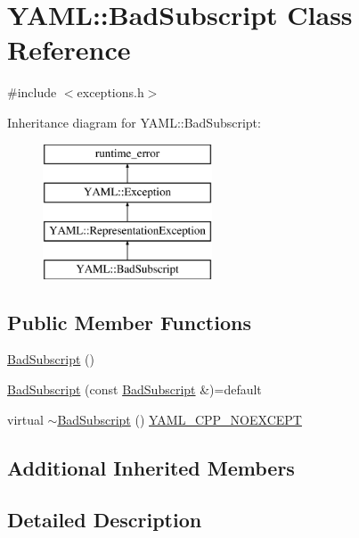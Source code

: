 \hypertarget{class_y_a_m_l_1_1_bad_subscript}{}\section{Y\+A\+ML\+::Bad\+Subscript Class Reference}
\label{class_y_a_m_l_1_1_bad_subscript}


{\ttfamily \#include $<$exceptions.\+h$>$}

Inheritance diagram for Y\+A\+ML\+::Bad\+Subscript\+:\begin{figure}[H]
\begin{center}
\leavevmode
\includegraphics[height=4.000000cm]{class_y_a_m_l_1_1_bad_subscript}
\end{center}
\end{figure}
\subsection*{Public Member Functions}
\begin{DoxyCompactItemize}
\item 
\mbox{\hyperlink{class_y_a_m_l_1_1_bad_subscript_ac11fdfe3b3952ddae3dd41778bc8a24d}{Bad\+Subscript}} ()
\item 
\mbox{\hyperlink{class_y_a_m_l_1_1_bad_subscript_ac113edeb7d289e74f1104a5e26cb3894}{Bad\+Subscript}} (const \mbox{\hyperlink{class_y_a_m_l_1_1_bad_subscript}{Bad\+Subscript}} \&)=default
\item 
virtual \mbox{\hyperlink{class_y_a_m_l_1_1_bad_subscript_a7f8b9e3d6704910d898ffcf0b58e1ee1}{$\sim$\+Bad\+Subscript}} () \mbox{\hyperlink{exceptions_8cpp_a4ea58eb0a28000364858d4942add7d1a}{Y\+A\+M\+L\+\_\+\+C\+P\+P\+\_\+\+N\+O\+E\+X\+C\+E\+PT}}
\end{DoxyCompactItemize}
\subsection*{Additional Inherited Members}


\subsection{Detailed Description}


